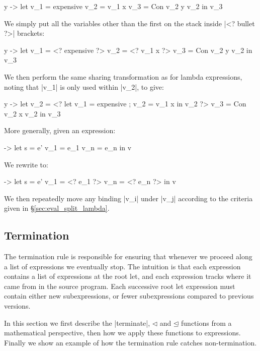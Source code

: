 \documentclass[draft]{sigplanconf}
\begin{document}
\begin{code}
\x y ->  let  v_1 = expensive
              v_2 = v_1 x
              v_3 = Con v_2 y v_2
         in   v_3
\end{code}

We simply put all the variables other than the first on the stack inside |<? bullet ?>| brackets:

\begin{code}
\x y ->  let  v_1 = <? expensive ?>
              v_2 = <? v_1 x ?>
              v_3 = Con v_2 y v_2
         in   v_3
\end{code}

We then perform the same sharing transformation as for lambda expressions, noting that |v_1| is only used within |v_2|, to give:

\begin{code}
\x y ->  let  v_2 = <? let v_1 = expensive ; v_2 = v_1 x in v_2 ?>
              v_3 = Con v_2 x v_2
         in   v_3
\end{code}

More generally, given an expression:

\begin{code}
\free ->  let  s   = e'
               v_1 = e_1
               v_n = e_n
          in   v
\end{code}

We rewrite to:

\begin{code}
\free ->  let  s   = e'
               v_1 = <? e_1 ?>
               v_n = <? e_n ?>
          in   v
\end{code}

We then repeatedly move any binding |v_i| under |v_j| according to the criteria given in \S\ref{sec:eval_split_lambda}.

\subsection{Termination}
\label{sec:term}

The termination rule is responsible for ensuring that whenever we proceed along a list of expressions we eventually stop. The intuition is that each expression contains a list of expressions at the root let, and each expression tracks where it came from in the source program. Each successive root let expression must contain either new subexpressions, or fewer subexpressions compared to previous versions.

In this section we first describe the |terminate|, $\lhd$ and $\unlhd$ functions from a mathematical perspective, then how we apply these functions to expressions. Finally we show an example of how the termination rule catches non-termination.
\end{document}
